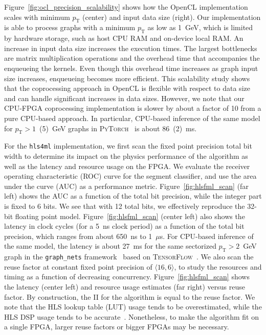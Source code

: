 \documentclass{article}
\newcommand{\hlsfml}{\texttt{hls4ml}\xspace}
\newcommand{\pt}{\ensuremath{p_{\mathrm{T}}}\xspace}
\begin{document}
Figure~\ref{fig:ocl_precision_scalability} shows how the OpenCL implementation scales with minimum $\pt$ (center) and input data size (right).
Our implementation is able to process graphs with a minimum $\pt$ as low as 1~GeV, which is limited by hardware storage, such as host CPU RAM and on-device local RAM. 
An increase in input data size increases the execution times. 
The largest bottlenecks are matrix multiplication operations and the overhead time that accompanies the enqueueing the kernels. %
Even though this overhead time increases as graph input size increases, enqueueing becomes more efficient. %
This scalability study shows that the coprocessing approach in OpenCL is flexible with respect to data size and can handle significant increases in data sizes.
However, we note that our CPU-FPGA coprocessing implementation is slower by about a factor of 10 from a pure CPU-based approach. 
In particular, CPU-based inference of the same model for $\pt > 1$~(5)~GeV graphs in \textsc{PyTorch}~\cite{pytorch} is about 86~(2)~ms.

For the \hlsfml implementation, we first scan the fixed point precision total bit width to determine its impact on the physics performance of the algorithm as well as the latency and resource usage on the FPGA. 
We evaluate the receiver operating characteristic (ROC) curve for the segment classifier, and use the area under the curve (AUC) as a performance metric. 
Figure~\ref{fig:hlsfml_scan} (far left) shows the AUC as a function of the total bit precision, while the integer part is fixed to 6 bits.
We see that with 12 total bits, we effectively reproduce the 32-bit floating point model.
Figure~\ref{fig:hlsfml_scan} (center left) also shows the latency in clock cycles (for a 5~ns clock period) as a function of the total bit precision, which ranges from about 650~ns to 1~$\mu$s.
For CPU-based inference of the same model, the latency is about 27~ms for the same sectorized $\pt > 2$~GeV graph in the \texttt{graph\_nets} framework~\cite{graph_nets} based on \textsc{TensorFlow}~\cite{tensorflow2015-whitepaper}.
We also scan the reuse factor at constant fixed point precision of $\langle16,6\rangle$, to study the resources and timing as a function of decreasing concurrency.
Figure~\ref{fig:hlsfml_scan} shows the latency (center left) and resource usage estimates (far right) versus reuse factor.
By construction, the II for the algorithm is equal to the reuse factor.
We note that the HLS lookup table (LUT) usage tends to be overestimated, while the HLS DSP usage tends to be accurate~\cite{Duarte:2018ite,Iiyama:2020wap,DiGuglielmo:2020eqx}.
Nonetheless, to make the algorithm fit on a single FPGA, larger reuse factors or bigger FPGAs may be necessary.
\end{document}
